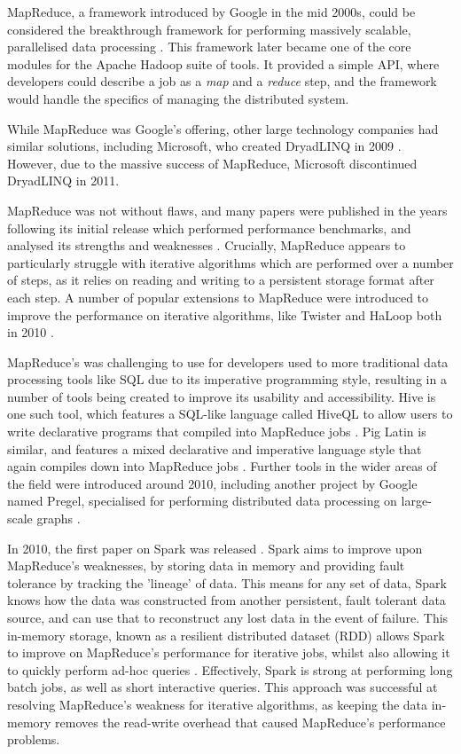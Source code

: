 MapReduce, a framework introduced by Google in the mid 2000s, could be considered the breakthrough framework for performing massively scalable, parallelised data processing \cite{dean2008mapreduce}. This framework later became one of the core modules for the Apache Hadoop suite of tools. It provided a simple API, where developers could describe a job as a \textit{map} and a \textit{reduce} step, and the framework would handle the specifics of managing the distributed system. 

While MapReduce was Google's offering, other large technology companies had similar solutions, including Microsoft, who created DryadLINQ in 2009 \cite{fetterly2009dryadlinq}. However, due to the massive success of MapReduce, Microsoft discontinued DryadLINQ in 2011.

MapReduce was not without flaws, and many papers were published in the years following its initial release which performed performance benchmarks, and analysed its strengths and weaknesses \cite{lee2012parallel}. Crucially, MapReduce appears to particularly struggle with iterative algorithms which are performed over a number of steps, as it relies on reading and writing to a persistent storage format after each step. A number of popular extensions to MapReduce were introduced to improve the performance on iterative algorithms, like Twister and HaLoop both in 2010 \cite{ekanayake2010twister, bu2010haloop}.

MapReduce's was challenging to use for developers used to more traditional data processing tools like SQL due to its imperative programming style, resulting in a number of tools being created to improve its usability and accessibility. Hive is one such tool, which features a SQL-like language called HiveQL to allow users to write declarative programs that compiled into MapReduce jobs \cite{thusoo2010hive}. Pig Latin is similar, and features a mixed declarative and imperative language style that again compiles down into MapReduce jobs \cite{olston2008pig}. Further tools in the wider areas of the field were introduced around 2010, including another project by Google named Pregel, specialised for performing distributed data processing on large-scale graphs \cite{malewicz2010pregel}.

In 2010, the first paper on Spark was released \cite{zaharia2010spark}. Spark aims to improve upon MapReduce's weaknesses, by storing data in memory and providing fault tolerance by tracking the 'lineage' of data. This means for any set of data, Spark knows how the data was constructed from another persistent, fault tolerant data source, and can use that to reconstruct any lost data in the event of failure. This in-memory storage, known as a resilient distributed dataset (RDD) allows Spark to improve on MapReduce's performance for iterative jobs, whilst also allowing it to quickly perform ad-hoc queries \cite{zaharia2012rdd}. Effectively, Spark is strong at performing long batch jobs, as well as short interactive queries. This approach was successful at resolving MapReduce's weakness for iterative algorithms, as keeping the data in-memory removes the read-write overhead that caused MapReduce's performance problems. 

